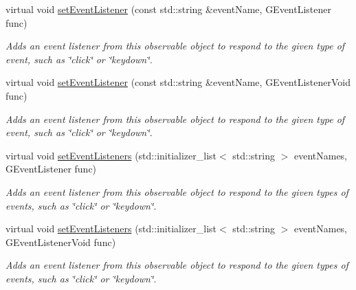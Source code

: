 \begin{DoxyCompactItemize}
virtual void \mbox{\hyperlink{classGObservable_ad2f6d34961c50f6c1e0659990b79f741}{set\+Event\+Listener}} (const std\+::string \&event\+Name, G\+Event\+Listener func)
\begin{DoxyCompactList}\small\item\em Adds an event listener from this observable object to respond to the given type of event, such as \char`\"{}click\char`\"{} or \char`\"{}keydown\char`\"{}. \end{DoxyCompactList}\item 
virtual void \mbox{\hyperlink{classGObservable_abac4cb9f9e626e010e87f5d91573c8a5}{set\+Event\+Listener}} (const std\+::string \&event\+Name, G\+Event\+Listener\+Void func)
\begin{DoxyCompactList}\small\item\em Adds an event listener from this observable object to respond to the given type of event, such as \char`\"{}click\char`\"{} or \char`\"{}keydown\char`\"{}. \end{DoxyCompactList}\item 
virtual void \mbox{\hyperlink{classGObservable_afa388d69c33c718cf035774604065604}{set\+Event\+Listeners}} (std\+::initializer\+\_\+list$<$ std\+::string $>$ event\+Names, G\+Event\+Listener func)
\begin{DoxyCompactList}\small\item\em Adds an event listener from this observable object to respond to the given types of events, such as \char`\"{}click\char`\"{} or \char`\"{}keydown\char`\"{}. \end{DoxyCompactList}\item 
virtual void \mbox{\hyperlink{classGObservable_a7867184bbb686f74fae8a4db927da799}{set\+Event\+Listeners}} (std\+::initializer\+\_\+list$<$ std\+::string $>$ event\+Names, G\+Event\+Listener\+Void func)
\begin{DoxyCompactList}\small\item\em Adds an event listener from this observable object to respond to the given types of events, such as \char`\"{}click\char`\"{} or \char`\"{}keydown\char`\"{}. \end{DoxyCompactList}\end{DoxyCompactItemize}
